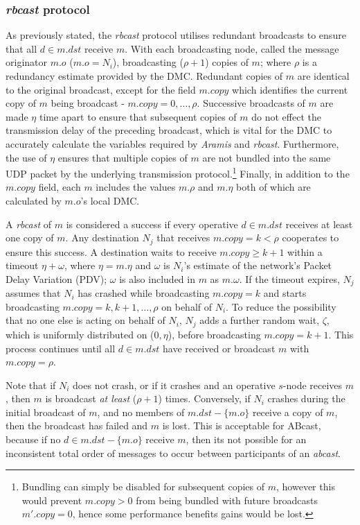     \subsubsection*{\emph{rbcast} protocol}
    As previously stated, the \emph{rbcast} protocol utilises redundant broadcasts to ensure that all $d \in m.dst$ receive $m$.  With each broadcasting node, called the message originator $m.o$ ($m.o = N_i$), broadcasting ($\rho + 1$) copies of $m$; where $\rho$ is a redundancy estimate provided by the DMC.  Redundant copies of $m$ are identical to the original broadcast, except for the field $m.copy$ which identifies the current copy of $m$ being broadcast - $m.copy = 0,\ldots,\rho$.  Successive broadcasts of $m$ are made $\eta$ time apart to ensure that subsequent copies of $m$ do not effect the transmission delay of the preceding broadcast, which is vital for the DMC to accurately calculate the variables required by \emph{Aramis} and \emph{rbcast}.  Furthermore, the use of $\eta$ ensures that multiple copies of $m$ are not bundled into the same UDP packet by the underlying transmission protocol.\footnote{Bundling can simply be disabled for subsequent copies of $m$, however this would prevent $m.copy > 0$ from being bundled with future broadcasts $m'.copy = 0$, hence some performance benefits gains would be lost.}  Finally, in addition to the $m.copy$ field, each $m$ includes the values $m.\rho$ and $m.\eta$ both of which are calculated by $m.o$'s local DMC.  
    
    A \emph{rbcast} of $m$ is considered a success if every operative $d \in m.dst$ receives at least one copy of $m$.  Any destination $N_j$ that receives $m.copy = k < \rho$ cooperates to ensure this success.  A destination waits to receive $m.copy \geq k + 1$ within a timeout $\eta + \omega$, where $\eta= m.\eta$ and $\omega$ is $N_i$'s estimate of the network's Packet Delay Variation (PDV); $\omega$ is also included in $m$ as $m.\omega$.  If the timeout expires, $N_j$ assumes that $N_i$ has crashed while broadcasting $m.copy = k$ and starts broadcasting $m.copy = k, k+1,\ldots, \rho$ on behalf of $N_i$. To reduce the possibility that no one else is acting on behalf of $N_i$, $N_j$ adds a further random wait, $\zeta$, which is uniformly distributed on ($0,\eta$), before broadcasting $m.copy = k+1$.  This process continues until all $d \in m.dst$ have received or broadcast $m$ with $m.copy = \rho$.  
    
    Note that if $N_i$ does not crash, or if it crashes and an operative $s$-node receives $m$, then $m$ is broadcast \emph{at least} ($\rho + 1$) times.  Conversely, if $N_i$ crashes during the initial broadcast of $m$, and no members of $m.dst - \{m.o\}$ receive a copy of $m$, then the broadcast has failed and $m$ is lost.  This is acceptable for \textsf{ABcast}, because if no $d \in m.dst - \{m.o\}$ receive $m$, then its not possible for an inconsistent total order of messages to occur between participants of an \emph{abcast}.  
    
